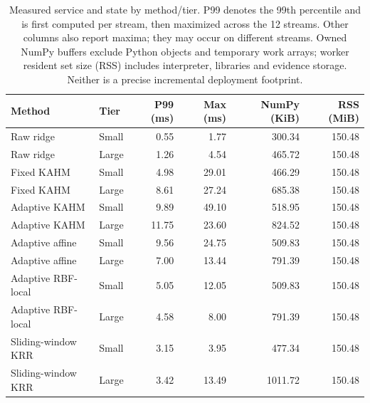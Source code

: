 \begin{table}[!htbp]
\centering\small\setlength{\tabcolsep}{5pt}
\caption{Measured service and state by method/tier. P99 denotes the 99th percentile and is first computed per stream, then maximized across the 12 streams. Other columns also report maxima; they may occur on different streams. Owned NumPy buffers exclude Python objects and temporary work arrays; worker resident set size (RSS) includes interpreter, libraries and evidence storage. Neither is a precise incremental deployment footprint.}
\label{tab:adaptive-development-resources}
\begin{tabular}{@{}llrrrr@{}}
\toprule
Method & Tier & P99 (ms) & Max (ms) & NumPy (KiB) & RSS (MiB) \\
\midrule
Raw ridge & Small & 0.55 & 1.77 & 300.34 & 150.48 \\
Raw ridge & Large & 1.26 & 4.54 & 465.72 & 150.48 \\
Fixed KAHM & Small & 4.98 & 29.01 & 466.29 & 150.48 \\
Fixed KAHM & Large & 8.61 & 27.24 & 685.38 & 150.48 \\
Adaptive KAHM & Small & 9.89 & 49.10 & 518.95 & 150.48 \\
Adaptive KAHM & Large & 11.75 & 23.60 & 824.52 & 150.48 \\
Adaptive affine & Small & 9.56 & 24.75 & 509.83 & 150.48 \\
Adaptive affine & Large & 7.00 & 13.44 & 791.39 & 150.48 \\
Adaptive RBF-local & Small & 5.05 & 12.05 & 509.83 & 150.48 \\
Adaptive RBF-local & Large & 4.58 & 8.00 & 791.39 & 150.48 \\
Sliding-window KRR & Small & 3.15 & 3.95 & 477.34 & 150.48 \\
Sliding-window KRR & Large & 3.42 & 13.49 & 1011.72 & 150.48 \\
\bottomrule
\end{tabular}
\end{table}
